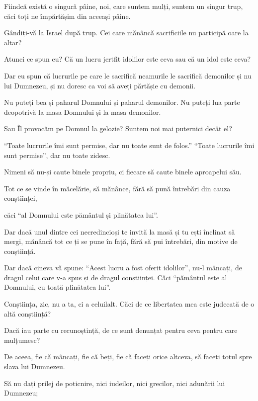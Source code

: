 {Fiindcă există o singură pâine, noi, care suntem mulți, suntem un singur trup, căci toți ne împărtășim din aceeași pâine.

Gândiți-vă la Israel după trup. Cei care mănâncă sacrificiile nu participă oare la altar?


\par }{\PP {}Atunci ce spun eu? Că un lucru jertfit idolilor este ceva sau că un idol este ceva?

Dar eu spun că lucrurile pe care le sacrifică neamurile le sacrifică demonilor și nu lui Dumnezeu, și nu doresc ca voi să aveți părtășie cu demonii.

Nu puteți bea și paharul Domnului și paharul demonilor. Nu puteți lua parte deopotrivă la masa Domnului și la masa demonilor.

Sau Îl provocăm pe Domnul la gelozie? Suntem noi mai puternici decât el?


\par }{\PP {}“Toate lucrurile îmi sunt permise, dar nu toate sunt de folos.” “Toate lucrurile îmi sunt permise”, dar nu toate zidesc.

Nimeni să nu-și caute binele propriu, ci fiecare să caute binele aproapelui său.

Tot ce se vinde în măcelărie, să mănânce, fără să pună întrebări din cauza conștiinței,

căci “al Domnului este pământul și plinătatea lui”.

Dar dacă unul dintre cei necredincioși te invită la masă și tu ești înclinat să mergi, mănâncă tot ce ți se pune în față, fără să pui întrebări, din motive de conștiință.

Dar dacă cineva vă spune: “Acest lucru a fost oferit idolilor”, nu-l mâncați, de dragul celui care v-a spus și de dragul conștiinței. Căci “pământul este al Domnului, cu toată plinătatea lui”.

Conștiința, zic, nu a ta, ci a celuilalt. Căci de ce libertatea mea este judecată de o altă conștiință?

Dacă iau parte cu recunoștință, de ce sunt denunțat pentru ceva pentru care mulțumesc?


\par }{\PP {}De aceea, fie că mâncați, fie că beți, fie că faceți orice altceva, să faceți totul spre slava lui Dumnezeu.

Să nu dați prilej de poticnire, nici iudeilor, nici grecilor, nici adunării lui Dumnezeu;

}
